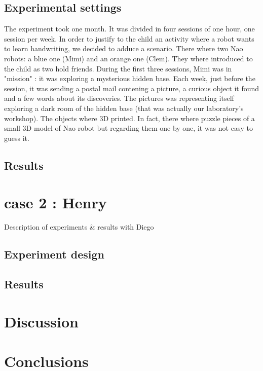 \documentclass{sig-alternate}
\begin{document}
\subsection{Experimental settings}
The experiment took one month. It was divided in four sessions of one hour, one session per week.
In order to justify to the child an activity where a robot wants to learn
handwriting, we decided to adduce a scenario. There where two Nao robots: a
blue one (Mimi) and an orange one (Clem). They where introduced to the child as two hold friends. During the first
three sessions, Mimi was in "mission" : it was exploring a mysterious hidden
base. Each week, just before the session, it was sending a postal mail contening
a picture, a curious object it found and a few words about its discoveries. The pictures was representing itself exploring 
a dark room of the hidden base (that was actually our laboratory's workshop). 
The objects where 3D printed. In fact, there where puzzle pieces of a small 3D 
model of Nao robot but regarding them one by one, it was not easy to guess it.




\subsection{Results}

\section{case 2 : Henry}
Description of experiments \& results with Diego

\subsection{Experiment design}

\subsection{Results}

\section{Discussion}

\section{Conclusions}


 
\end{document}
